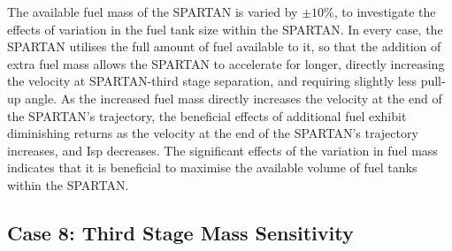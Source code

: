 The available fuel mass of the SPARTAN is varied by $\pm 10\%$, to investigate the effects of variation in the fuel tank size within the SPARTAN.
 In every case, the SPARTAN utilises the full amount of fuel available to it, so that the addition of extra fuel mass allows the SPARTAN to accelerate for longer, directly increasing the velocity at SPARTAN-third stage separation, and requiring slightly less pull-up angle. 
As the increased fuel mass directly increases the velocity at the end of the SPARTAN's trajectory, the beneficial effects of additional fuel exhibit diminishing returns as the velocity at the end of the SPARTAN's trajectory increases, and Isp decreases.
The significant effects of the variation in fuel mass indicates that it is beneficial to maximise the available volume of fuel tanks within the SPARTAN. 


\subsection{Case 8: Third Stage Mass Sensitivity}

